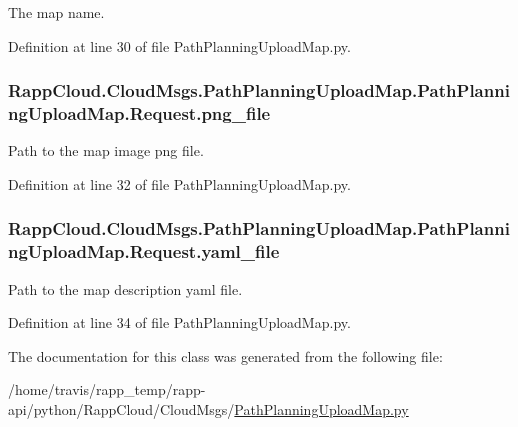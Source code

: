 The map name. 



Definition at line 30 of file Path\-Planning\-Upload\-Map.\-py.

\hypertarget{classRappCloud_1_1CloudMsgs_1_1PathPlanningUploadMap_1_1PathPlanningUploadMap_1_1Request_abccaa837456250c6bed5b219b1d02fbc}{
\subsubsection[{png\-\_\-file}]{\setlength{\rightskip}{0pt plus 5cm}Rapp\-Cloud.\-Cloud\-Msgs.\-Path\-Planning\-Upload\-Map.\-Path\-Planning\-Upload\-Map.\-Request.\-png\-\_\-file}}\label{classRappCloud_1_1CloudMsgs_1_1PathPlanningUploadMap_1_1PathPlanningUploadMap_1_1Request_abccaa837456250c6bed5b219b1d02fbc}


Path to the map image png file. 



Definition at line 32 of file Path\-Planning\-Upload\-Map.\-py.

\hypertarget{classRappCloud_1_1CloudMsgs_1_1PathPlanningUploadMap_1_1PathPlanningUploadMap_1_1Request_a287933cb420663c144b6fb33ba0827dd}{
\subsubsection[{yaml\-\_\-file}]{\setlength{\rightskip}{0pt plus 5cm}Rapp\-Cloud.\-Cloud\-Msgs.\-Path\-Planning\-Upload\-Map.\-Path\-Planning\-Upload\-Map.\-Request.\-yaml\-\_\-file}}\label{classRappCloud_1_1CloudMsgs_1_1PathPlanningUploadMap_1_1PathPlanningUploadMap_1_1Request_a287933cb420663c144b6fb33ba0827dd}


Path to the map description yaml file. 



Definition at line 34 of file Path\-Planning\-Upload\-Map.\-py.



The documentation for this class was generated from the following file\-:\begin{DoxyCompactItemize}
\item 
/home/travis/rapp\-\_\-temp/rapp-\/api/python/\-Rapp\-Cloud/\-Cloud\-Msgs/\hyperlink{PathPlanningUploadMap_8py}{Path\-Planning\-Upload\-Map.\-py}\end{DoxyCompactItemize}
